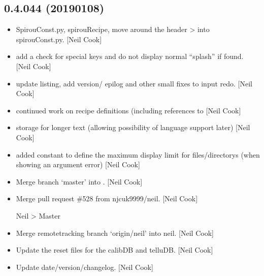 \documentclass[a4paper,10pt,english]{report}
\begin{document}
\subsection{0.4.044 (2019\sphinxhyphen{}01\sphinxhyphen{}08)}
\label{\detokenize{misc/changelog:id239}}\begin{itemize}
\item {} 
SpirouConst.py, spirouRecipe,  \sphinxhyphen{} move around the
header \textendash{}\textgreater{} into spirouConst.py. {[}Neil Cook{]}

\item {} 
 \sphinxhyphen{} add a check for special keys and do not display
normal “splash” if found. {[}Neil Cook{]}

\item {} 
 \sphinxhyphen{} update listing, add version/ epilog and other small
fixes to input redo. {[}Neil Cook{]}

\item {} 
 \sphinxhyphen{} continued work on recipe definitions (including
references to  {[}Neil Cook{]}

\item {} 
 \sphinxhyphen{} storage for longer text (allowing possibility
of language support later) {[}Neil Cook{]}

\item {} 
 \sphinxhyphen{} added constant to define the maximum display limit
for files/directorys (when showing an argument error) {[}Neil Cook{]}

\item {} 
Merge branch ‘master’ into . {[}Neil Cook{]}

\item {} 
Merge pull request \#528 from njcuk9999/neil. {[}Neil Cook{]}

Neil \textendash{}\textgreater{} Master

\item {} 
Merge remote\sphinxhyphen{}tracking branch ‘origin/neil’ into neil. {[}Neil Cook{]}

\item {} 
Update the reset files for the calibDB and telluDB. {[}Neil Cook{]}

\item {} 
Update date/version/changelog. {[}Neil Cook{]}


\end{itemize}
\end{document}
